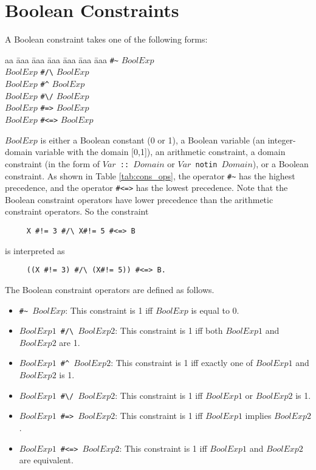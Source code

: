 \section{Boolean Constraints}
A Boolean constraint takes one of the following forms:
\begin{tabbing}
aa \= aaa \= aaa \= aaa \= aaa \= aaa \= aaa \kill
\> \verb+#~+ $BoolExp$ \\
\>   $BoolExp$ \verb+#/\+ $BoolExp$ \\
\>   $BoolExp$ \verb+#^+ $BoolExp$ \\
\>   $BoolExp$ \verb+#\/+ $BoolExp$ \\
\>   $BoolExp$ \verb+#=>+ $BoolExp$ \\
\>   $BoolExp$ \verb+#<=>+ $BoolExp$ \\
\end{tabbing}
$BoolExp$ is either a Boolean constant (0 or 1), a Boolean variable (an integer-domain variable with the domain [0,1]), an arithmetic constraint, a domain constraint (in the form of \texttt{$Var$ :: $Domain$} or \texttt{$Var$ notin $Domain$}), or a Boolean constraint. As shown in Table \ref{tab:cons_ops}, the operator \verb+#~+ has the highest precedence, and the operator \verb+#<=>+ has the lowest precedence. Note that the Boolean constraint operators have lower precedence than the arithmetic constraint operators. So the constraint 
\begin{verbatim}
     X #!= 3 #/\ X#!= 5 #<=> B
\end{verbatim}
is interpreted as
\begin{verbatim}
     ((X #!= 3) #/\ (X#!= 5)) #<=> B.
\end{verbatim}
The Boolean constraint operators are defined as follows.
\begin{itemize}
\item {\tt \verb+#~+ $BoolExp$}: This constraint is 1 iff $BoolExp$ is equal to 0.
\item {\tt $BoolExp1$ \verb+#/\+ $BoolExp2$}: This constraint is 1 iff both $BoolExp1$ and $BoolExp2$ are 1.
\item {\tt $BoolExp1$ \verb+#^+ $BoolExp2$}:  This constraint is 1 iff exactly one of $BoolExp1$ and $BoolExp2$ is 1.
\item {\tt $BoolExp1$ \verb+#\/+ $BoolExp2$}:  This constraint is 1 iff $BoolExp1$ or $BoolExp2$ is 1.
\item {\tt $BoolExp1$ \verb+#=>+ $BoolExp2$}: This constraint is 1 iff $BoolExp1$ implies $BoolExp2$.
\item {\tt $BoolExp1$ \verb+#<=>+ $BoolExp2$}: This constraint is 1 iff $BoolExp1$ and $BoolExp2$ are equivalent.
\end{itemize}

